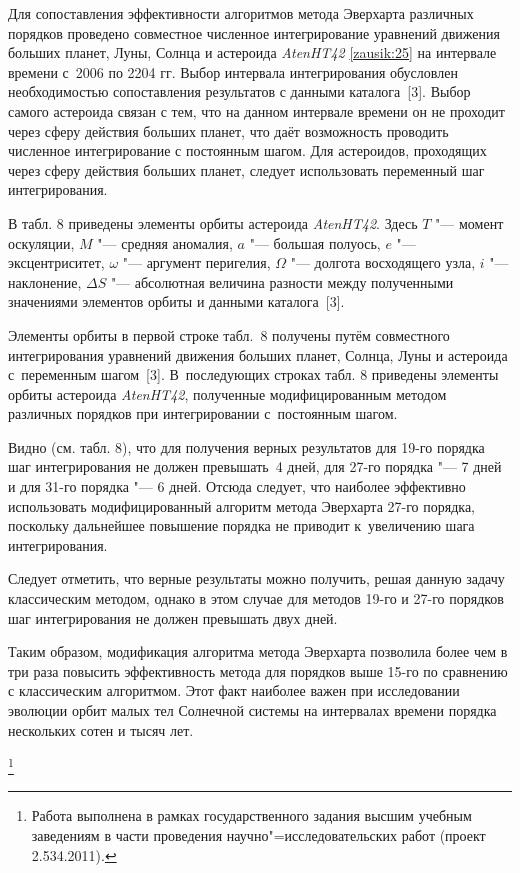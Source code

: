 Для сопоставления эффективности алгоритмов метода Эверхарта различных порядков проведено совместное численное интегрирование уравнений движения больших планет, Луны, Солнца и астероида {\sl Aten\;HT42} \eqref{zausik:25} на интервале времени с~2006 по 2204 гг. Выбор интервала интегрирования обусловлен необходимостью сопоставления результатов с данными каталога~[3]. 
Выбор самого астероида связан с тем, что на данном интервале времени он не проходит через сферу действия больших планет, что даёт возможность проводить численное интегрирование с постоянным шагом. Для астероидов, проходящих через сферу действия больших планет, следует использовать переменный шаг интегрирования.

В табл. 8 приведены элементы орбиты астероида {\sl Aten\;HT42}. Здесь $T$ "--- момент оскуляции, $M$ "--- средняя аномалия, $a$ "--- большая полуось, $e$ "--- эксцентриситет, $\omega$ "--- аргумент перигелия, $\Omega$ "--- долгота восходящего узла, $i$ "--- наклонение, $\Delta S$ "--- абсолютная величина разности между полученными значениями элементов орбиты и данными каталога~[3].

Элементы орбиты в первой строке табл.~8 получены путём совместного интегрирования уравнений движения больших планет, Солнца, Луны и астероида с~переменным шагом~[3]. 
В~последующих строках табл. 8 приведены элементы орбиты астероида {\sl Aten\;HT42}, полученные модифицированным методом различных порядков при интегрировании с~постоянным шагом.

Видно (см. табл. 8), что для получения верных результатов для 19-го порядка шаг интегрирования не должен превышать~4 дней, для 27-го порядка "--- 7 дней и для 31-го порядка "--- 6 дней. 
Отсюда следует, что наиболее эффективно использовать модифицированный алгоритм метода Эверхарта 27-го порядка, поскольку дальнейшее повышение порядка не приводит к~увеличению шага интегрирования. \pagebreak

Следует отметить, что верные результаты можно получить, решая данную задачу классическим методом, однако в этом случае для методов 19-го и 27-го порядков шаг интегрирования не должен превышать двух дней.

Таким образом, модификация алгоритма метода Эверхарта позволила более чем в три раза повысить эффективность метода для порядков выше 15-го по сравнению с классическим алгоритмом. Этот факт наиболее важен при исследовании эволюции орбит малых тел Солнечной системы на интервалах времени порядка нескольких сотен и тысяч лет.


\thanks{Работа выполнена в рамках государственного задания высшим учебным заведениям в части проведения
научно"=исследовательских работ (проект 2.534.2011).}


